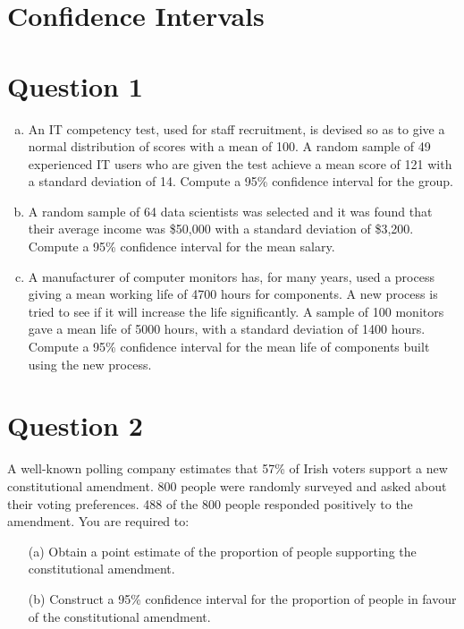 \documentclass[]{article}
\begin{document}
\section*{Confidence Intervals}
\smallskip




\section*{Question 1}
\begin{enumerate}[(a)]
    \item An IT competency test, used for staff recruitment, is devised so as to give a normal distribution of
scores with a mean of 100. A random sample of 49 experienced IT users who are given the test
achieve a mean score of 121 with a standard deviation of 14.
Compute a 95\% confidence interval for the group.
\item A random sample of 64 data scientists was selected and it was found that their average income was \${50,000} with a standard deviation of \${3,200}. 
Compute a 95\% confidence interval for the mean salary.
\item 
A manufacturer of computer monitors has, for many years, used a process giving a mean working life of 4700 hours for components. A new process is tried to see if it will increase the life significantly. A sample of 100 monitors gave a mean life of 5000 hours, with a standard deviation of 1400 hours.
Compute a 95\% confidence interval for the mean life of components built using the new process.

\end{enumerate}


	
	
\section*{Question 2}
A well-known polling company estimates that 57\% of Irish voters support a
new constitutional amendment. 800 people were randomly surveyed and
asked about their voting preferences. 488 of the 800 people responded
positively to the amendment. You are required to:
\begin{itemize}
\item[(a)] Obtain a point estimate of the proportion of people supporting
the constitutional amendment.
\item[(b)] Construct a  95\% confidence interval for the proportion of
people in favour of the constitutional amendment.
\end{itemize}
\end{document}
